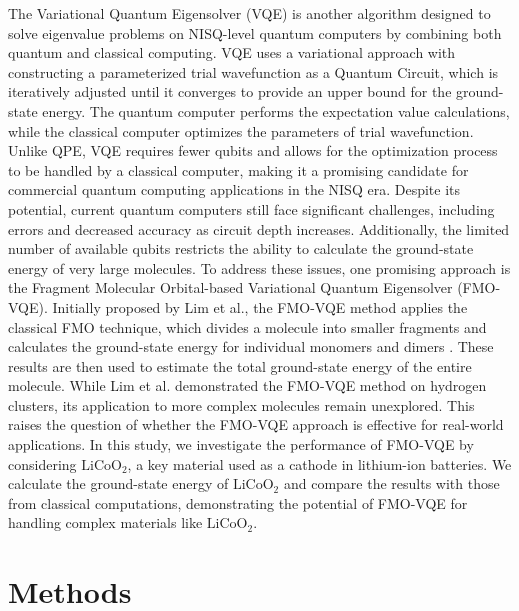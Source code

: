 \documentclass[pdflatex,sn-mathphys-num]{sn-jnl}%
\theoremstyle{thmstyleone}%
\theoremstyle{thmstyletwo}%
\theoremstyle{thmstylethree}%
\begin{document}
The Variational Quantum Eigensolver (VQE) is another algorithm designed to solve eigenvalue problems on NISQ-level quantum computers by combining both quantum and classical computing\cite{VQE1,VQE2,VQE3,VQE4}.
VQE uses a variational approach with constructing a parameterized trial wavefunction as a Quantum Circuit, 
which is iteratively adjusted until it converges to provide an upper bound for the ground-state energy. 
The quantum computer performs the expectation value calculations, while the classical computer optimizes the parameters of trial wavefunction.
Unlike QPE, VQE requires fewer qubits and allows for the optimization process to be handled by a classical computer, 
making it a promising candidate for commercial quantum computing applications in the NISQ era\cite{VQEAPL1,VQEAPL2,VQEAPL3,VQEAPL4}. 
Despite its potential, current quantum computers still face significant challenges, including errors and decreased accuracy as circuit depth increases. 
Additionally, the limited number of available qubits restricts the ability to calculate the ground-state energy of very large molecules. 
To address these issues, one promising approach is the Fragment Molecular Orbital-based Variational Quantum Eigensolver (FMO-VQE).
Initially proposed by Lim et al.\cite{FMOVQE}, the FMO-VQE method applies the classical FMO technique, which divides a molecule into smaller fragments and calculates the ground-state energy for individual monomers and dimers \cite{FMO1,FMO2,FMO3,FMO4}. 
These results are then used to estimate the total ground-state energy of the entire molecule. 
While Lim et al. demonstrated the FMO-VQE method on hydrogen clusters, its application to more complex molecules remain unexplored. 
This raises the question of whether the FMO-VQE approach is effective for real-world applications. 
In this study, we investigate the performance of FMO-VQE by considering \(\mathrm{LiCoO_2}\), a key material used as a cathode in lithium-ion batteries. We calculate the ground-state energy of \(\mathrm{LiCoO_2}\) and compare the results with those from classical computations, demonstrating the potential of FMO-VQE for handling complex materials like \(\mathrm{LiCoO_2}\).

\section{Methods}\label{sec2}
\end{document}
